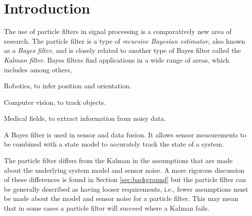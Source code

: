 \section{Introduction}
The use of particle filters in signal processing is a comparatively new area of
research. The particle filter is a type of \emph{recursive Bayesian estimator},
also known as a \emph{Bayes filter}, and is closely related to another type
of Bayes filter called the \emph{Kalman filter}. Bayes filters find
applications in a wide range of areas, which includes among others,
\begin{compactitem}
\item Robotics, to infer position and orientation.
\item Computer vision, to track objects.
\item Medical fields, to extract information from noisy data.
\end{compactitem}
A Bayes filter is used in sensor and data fusion. It allows sensor measurements
to be combined with a state model to accurately track the state of a system.

The particle filter differs from the Kalman in the assumptions that are made
about the underlying system model and sensor noise. A more rigorous discussion
of these differences is found in Section \ref{sec:background} but the particle filter
can be generally described as having looser requirements, i.e., fewer
assumptions must be made about the model and sensor noise for a particle filter.
This may mean that in some cases a particle filter will succeed where a Kalman fails.